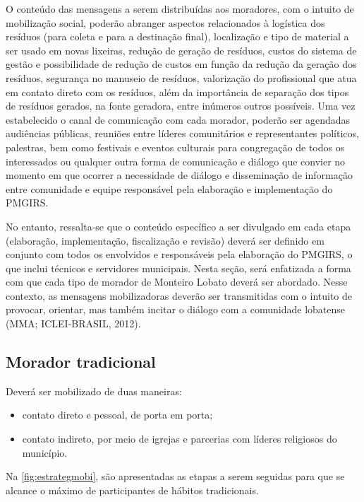 O conteúdo das mensagens a serem distribuídas aos moradores, com o intuito de mobilização social, poderão abranger aspectos relacionados à logística dos resíduos (para coleta e para a destinação final), localização e tipo de material a ser usado em novas lixeiras, redução de geração de resíduos, custos do sistema de gestão e possibilidade de redução de custos em função da redução da geração dos resíduos, segurança no manuseio de resíduos, valorização do profissional que atua em contato direto com os resíduos, além da importância de separação dos tipos de resíduos gerados, na fonte geradora, entre inúmeros outros possíveis. Uma vez estabelecido o canal de comunicação com cada morador, poderão ser agendadas audiências públicas, reuniões entre líderes comunitários e representantes políticos, palestras, bem como festivais e eventos culturais para congregação de todos os interessados ou qualquer outra forma de comunicação e diálogo que convier no momento em que ocorrer a necessidade de diálogo e disseminação de informação entre comunidade e equipe responsável pela elaboração e implementação do PMGIRS.

No entanto, ressalta-se que o conteúdo específico a ser divulgado em cada etapa (elaboração, implementação, fiscalização e revisão) deverá ser definido em conjunto com todos os envolvidos e responsáveis pela elaboração do PMGIRS, o que inclui técnicos e servidores municipais. Nesta seção, será enfatizada a forma com que cada tipo de morador de Monteiro Lobato deverá ser abordado. Nesse contexto, as mensagens mobilizadoras deverão ser transmitidas com o intuito de provocar, orientar, mas também incitar o diálogo com a comunidade lobatense (MMA; ICLEI-BRASIL, 2012).

\subsection{Morador tradicional}

Deverá ser mobilizado de duas maneiras:
\begin{itemize}
	\item contato direto e pessoal, de porta em porta;
	\item contato indireto, por meio de igrejas e parcerias com líderes religiosos do município.
\end{itemize}

Na \autoref{fig:estrategmobi}, são apresentadas as etapas a serem seguidas para que se alcance o máximo de participantes de hábitos tradicionais.

